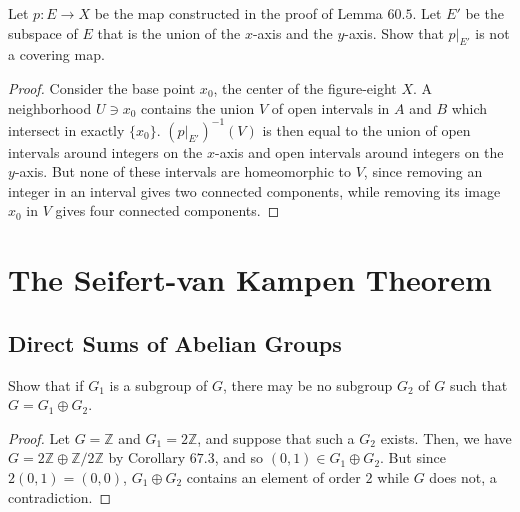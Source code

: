 \documentclass[12pt]{article}
\theoremstyle{remark}
\begin{document}
\setcounter{subsubsection}{2}
\begin{problem}
  Let $p\colon E \to X$ be the map constructed in the proof of Lemma $60.5$. Let $E'$ be the subspace of $E$ that is the union of the $x$-axis and the $y$-axis. Show that $p |_{E'}$ is not a covering map.
\end{problem}
\begin{proof}
  Consider the base point $x_0$, the center of the figure-eight $X$. A
  neighborhood $U \ni x_0$ contains the union $V$ of open intervals in $A$ and
  $B$ which intersect in exactly $\{x_0\}$. $(p |_{E'})^{-1}(V)$ is then equal
  to the union of open intervals around integers on the $x$-axis and open
  intervals around integers on the $y$-axis. But none of these intervals are
  homeomorphic to $V$, since removing an integer in an interval gives two
  connected components, while removing its image $x_0$ in $V$ gives four connected components.
\end{proof}

\setcounter{section}{10}
\section{The Seifert-van Kampen Theorem}
\setcounter{subsection}{66}
\subsection{Direct Sums of Abelian Groups}
\setcounter{subsubsection}{1}
\begin{problem}
  Show that if $G_1$ is a subgroup of $G$, there may be no subgroup $G_2$ of $G$ such that $G = G_1 \oplus G_2$.
\end{problem}
\begin{proof}
  Let $G = \mathbb{Z}$ and $G_1 = 2\mathbb{Z}$, and suppose that such a $G_2$ exists. Then, we have $G = 2\mathbb{Z} \oplus \mathbb{Z}/2\mathbb{Z}$ by Corollary $67.3$, and so $(0,1) \in G_1 \oplus G_2$. But since $2(0,1) = (0,0)$, $G_1 \oplus G_2$ contains an element of order $2$ while $G$ does not, a contradiction.
\end{proof}
\end{document}
